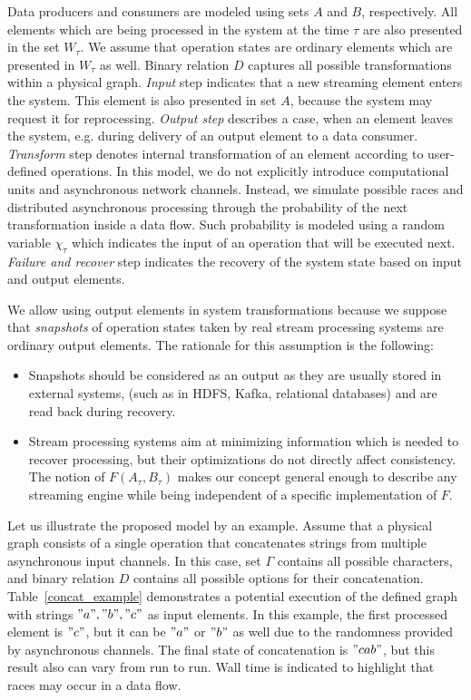 Data producers and consumers are modeled using sets $A$ and $B$, respectively. All elements which are being processed in the system at the time $\tau$ are also presented in the set $W_\tau$. We assume that operation states are ordinary elements which are presented in $W_\tau$ as well. Binary relation $D$ captures all possible transformations within a physical graph. {\em Input} step indicates that a new streaming element enters the system. This element is also presented in set $A$, because the system may request it for reprocessing. {\em Output step} describes a case, when an element leaves the system, e.g. during delivery of an output element to a data consumer. {\em Transform} step denotes internal transformation of an element according to user-defined operations. In this model, we do not explicitly introduce computational units and asynchronous network channels. Instead, we simulate possible races and distributed asynchronous processing through the probability of the next transformation inside a data flow. Such probability is modeled using a random variable $\chi_\tau$ which indicates the input of an operation that will be executed next. {\em Failure and recover} step indicates the recovery of the system state based on input and output elements.


We allow using output elements in system transformations because we suppose that {\em snapshots} of operation states taken by real stream processing systems are ordinary output elements. The rationale for this assumption is the following:

\begin{itemize}
    \item Snapshots should be considered as an output as they are usually stored in external systems, (such as in HDFS, Kafka, relational databases)   and are read back during recovery. 
    \item Stream processing systems aim at minimizing information which is needed to recover processing, but their optimizations do not directly affect consistency. The notion of $F(A_\tau,B_\tau)$ makes our concept general enough to describe any streaming engine while being independent of a specific implementation of $F$.
\end{itemize}

Let us illustrate the proposed model by an example. Assume that a physical graph consists of a single operation that concatenates strings from multiple asynchronous input channels. In this case, set $\Gamma$ contains all possible characters, and binary relation $D$ contains all possible options for their concatenation. Table~\ref{concat_example} demonstrates a potential execution of the defined graph with strings $"a","b","c"$ as input elements. In this example, the first processed element is $"c"$, but it can be $"a"$ or $"b"$ as well due to the randomness provided by asynchronous channels. The final state of concatenation is $"cab"$, but this result also can vary from run to run. Wall time is indicated to highlight that races may occur in a data flow.

